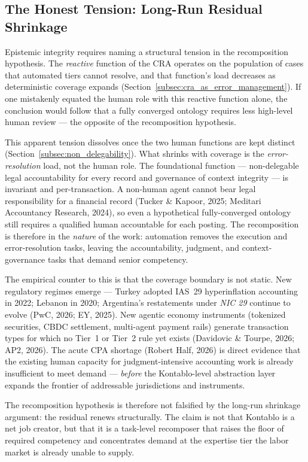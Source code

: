 \subsection{The Honest Tension: Long-Run Residual Shrinkage}
\label{subsec:honest_tension}

Epistemic integrity requires naming a structural tension in the recomposition
hypothesis. The \emph{reactive} function of the CRA operates on the population
of cases that automated tiers cannot resolve, and that function's load
decreases as deterministic coverage expands
(Section~\ref{subsec:cra_as_error_management}). If one mistakenly equated the
human role with this reactive function alone, the conclusion would follow that
a fully converged ontology requires less high-level human review --- the
opposite of the recomposition hypothesis.

This apparent tension dissolves once the two human functions are kept distinct
(Section~\ref{subsec:non_delegability}). What shrinks with coverage is the
\emph{error-resolution} load, not the human role. The foundational
function --- non-delegable legal accountability for every record and
governance of context integrity --- is invariant and per-transaction. A
non-human agent cannot bear legal responsibility for a financial record
(Tucker \& Kapoor, 2025; Meditari Accountancy Research, 2024), so even a
hypothetical fully-converged ontology still requires a qualified human
accountable for each posting. The recomposition is therefore in the
\emph{nature} of the work: automation removes the execution and
error-resolution tasks, leaving the accountability, judgment, and
context-governance tasks that demand senior competency.

The empirical counter to this is that the coverage boundary is not static.
New regulatory regimes emerge --- Turkey adopted IAS~29 hyperinflation
accounting in 2022; Lebanon in 2020; Argentina's restatements under
\textit{NIC 29} continue to evolve (PwC, 2026; EY, 2025). New agentic
economy instruments (tokenized securities, CBDC settlement, multi-agent
payment rails) generate transaction types for which no Tier~1 or Tier~2
rule yet exists (Davidovic \& Tourpe, 2026; AP2, 2026). The acute CPA
shortage (Robert Half, 2026) is direct evidence that the existing human
capacity for judgment-intensive accounting work is already insufficient to
meet demand --- \emph{before} the Kontablo-level abstraction layer expands
the frontier of addressable jurisdictions and instruments.

The recomposition hypothesis is therefore not falsified by the long-run
shrinkage argument: the residual renews structurally. The claim is not that
Kontablo is a net job creator, but that it is a task-level recomposer that
raises the floor of required competency and concentrates demand at the
expertise tier the labor market is already unable to supply.

